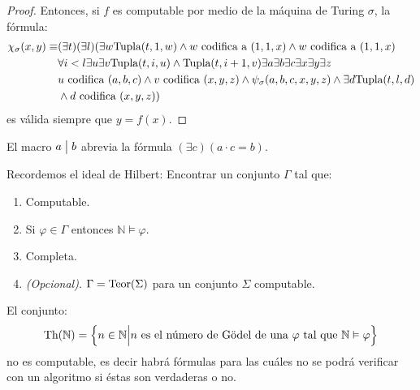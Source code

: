 \documentclass[12pt]{report}
\newcounter{it}
\theoremstyle{largebreak}
\newcommand\divides{\ensuremath{\bigm|}}
\begin{document}
\begin{proof}
        Entonces, si $f$ es computable por medio de la máquina de Turing $\sigma$, la fórmula:
        \begin{equation*}
            \begin{split}
                \chi_\sigma(x,y)\equiv&(\exists t)(\exists l)(\exists w \textup{Tupla}(t,1,w) \land w\textup{ codifica a }(1,1,x)\land w\textup{ codifica a }(1,1,x)\\
                &\forall i<l\exists u\exists v \textup{Tupla}(t,i,u)\land \textup{Tupla}(t,i+1,v)\exists a\exists b\exists c\exists x\exists y\exists z \\
                &u\textup{ codifica }(a,b,c)\land v\textup{ codifica }(x,y,z)\land\psi_\sigma(a,b,c,x,y,z)\land\exists d\textup{Tupla}(t,l,d)\\
                &\land d\textup{ codifica }(x,y,z))\\
            \end{split}
        \end{equation*}
        es válida siempre que $y=f(x)$.
    \end{proof}

    \begin{obs}
        El macro $a\divides b$ abrevia la fórmula $(\exists c)(a\cdot c= b)$.
    \end{obs}

    Recordemos el ideal de Hilbert: Encontrar un conjunto $\Gamma$ tal que:
    \begin{enumerate}[label = \textit{(\arabic*)}]
        \item Computable.
        \item Si $\varphi\in\Gamma$ entonces $\mathbb{N}\vDash\varphi$.
        \item Completa.
        \item \textit{(Opcional)}. $\Gamma=\textup{Teor}(\Sigma)$ para un conjunto $\Sigma$ computable.
    \end{enumerate}

    \begin{theor}
        El conjunto:
        \begin{equation*}
            \textup{Th}(\mathbb{N})=\left\{n\in\mathbb{N}\Big|n\textup{ es el número de Gödel de una }\varphi\textup{ tal que }\mathbb{N}\vDash\varphi \right\}
        \end{equation*}
        no es computable, es decir habrá fórmulas para las cuáles no se podrá verificar con un algoritmo si éstas son verdaderas o no.
    \end{theor}
\end{document}
